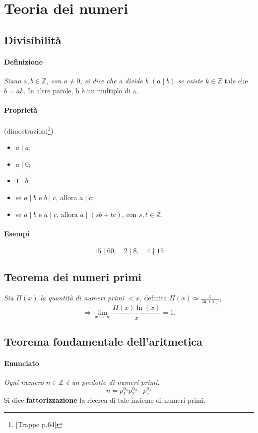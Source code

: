 \documentclass[12pt]{article}
\begin{document}
\section{Teoria dei numeri}
\subsection{Divisibilità}
\paragraph{Definizione}
\textit{Siano $a,b\in \mathbb{Z}$, con $a\neq 0$, si dice che a divide b $(a\mid b)$ se esiste $k\in \mathbb{Z}$} tale che $b=ak$. In altre parole, b è un multiplo di a.
\paragraph{Proprietà} (dimostrazioni\footnote{[Trappe p.64]})
\begin{itemize}
\item $a\mid a$;
\item $a\mid 0$;
\item $1\mid b$;
\item se $a\mid b$ e $b\mid c$, allora $a\mid c$;
\item se $a\mid b$ e $a\mid c$, allora $a\mid (sb + tc)$, con $s,t\in \mathbb{Z}$.
\end{itemize}
\paragraph{Esempi}
$$15\mid 60,\quad 2\mid 8,\quad 4\nmid 15$$
\subsection{Teorema dei numeri primi}
\textit{Sia $\Pi (x)$ la quantità di numeri primi $<x$,} definita $\Pi (x) \simeq \frac{x}{\ln{(x)}}$,
$$\Rightarrow \lim_{x\to\infty} \frac{\Pi (x)\ln{(x)}}{x}=1.$$
\subsection{Teorema fondamentale dell'aritmetica}
\paragraph{Enunciato} \textit{Ogni numero $n\in \mathbb{Z}$ è un prodotto di numeri primi.}
$$n=p_1^{\alpha _1}p_2^{\alpha _2}\cdots p_s^{\alpha _s}$$
Si dice \textbf{fattorizzazione} la ricerca di tale insieme di numeri primi.
\end{document}
